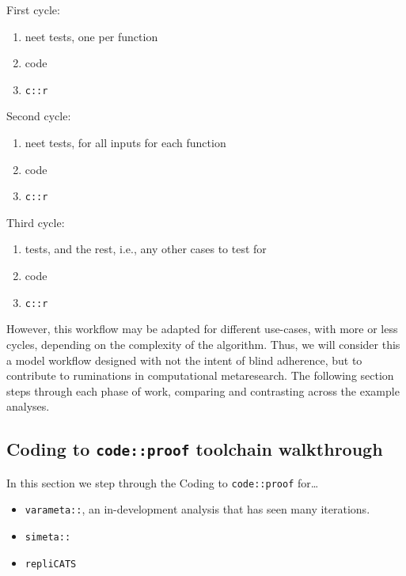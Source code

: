 \documentclass[
]{article}
\providecommand{\tightlist}{%
  \setlength{\itemsep}{0pt}\setlength{\parskip}{0pt}}
\begin{document}
First cycle:

\begin{enumerate}
\def\labelenumi{\arabic{enumi}.}
\setcounter{enumi}{1}
\tightlist
\item
  neet tests, one per function
\item
  code
\item
  \texttt{c::r}
\end{enumerate}

Second cycle:

\begin{enumerate}
\def\labelenumi{\arabic{enumi}.}
\setcounter{enumi}{4}
\tightlist
\item
  neet tests, for all inputs for each function
\item
  code
\item
  \texttt{c::r}
\end{enumerate}

Third cycle:

\begin{enumerate}
\def\labelenumi{\arabic{enumi}.}
\setcounter{enumi}{7}
\tightlist
\item
  tests, and the rest, i.e., any other cases to test for
\item
  code
\item
  \texttt{c::r}
\end{enumerate}

However, this workflow may be adapted for different use-cases, with more or less cycles, depending on the complexity of the algorithm. Thus, we will consider this a model workflow designed with not the intent of blind adherence, but to contribute to ruminations in computational metaresearch. The following section steps through each phase of work, comparing and contrasting across the example analyses.

\hypertarget{coding-to-codeproof-toolchain-walkthrough}{%
\subsection{\texorpdfstring{Coding to \texttt{code::proof} toolchain walkthrough}{Coding to code::proof toolchain walkthrough}}\label{coding-to-codeproof-toolchain-walkthrough}}

In this section we step through the Coding to \texttt{code::proof} for\ldots{}

\begin{itemize}
\tightlist
\item
  \texttt{varameta::}, an in-development analysis that has seen many iterations.\\
\item
  \texttt{simeta::}
\item
  \texttt{repliCATS}
\end{itemize}
\end{document}
